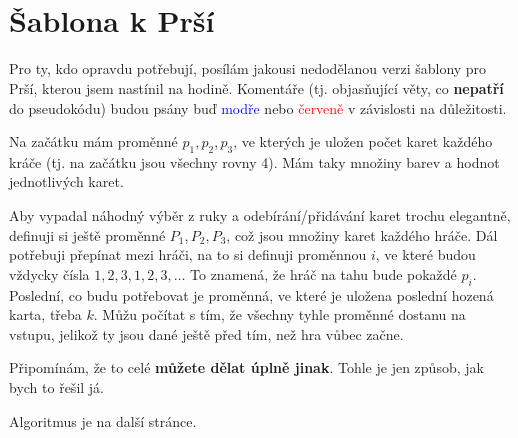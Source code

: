 \documentclass[a4paper,11pt]{article}
\title{\Huge\textsf{}\\
 \Large\textsf{}
 \author{}
 \date{}
}
\begin{document}
\section*{Šablona k Prší}

Pro ty, kdo opravdu potřebují, posílám jakousi nedodělanou verzi šablony pro
Prší, kterou jsem nastínil na hodině. Komentáře (tj. objasňující věty, co
\textbf{nepatří} do pseudokódu) budou psány buď \textcolor{blue}{modře} nebo
\textcolor{red}{červeně} v závislosti na důležitosti.

Na začátku mám proměnné $p_1, p_2, p_3$, ve kterých je uložen počet karet
každého kráče (tj. na začátku jsou všechny rovny 4). Mám taky množiny barev a
hodnot jednotlivých karet.

Aby vypadal náhodný výběr z ruky a odebírání/přidávání karet trochu elegantně,
definuji si ještě proměnné $P_1,P_2,P_3$, což jsou množiny karet každého hráče.
Dál potřebuji přepínat mezi hráči, na to si definuji proměnnou $i$, ve které
budou vždycky čísla $1, 2, 3, 1, 2, 3, \ldots$ To znamená, že hráč na tahu bude
pokaždé $p_i$. Poslední, co budu potřebovat je proměnná, ve které je uložena
poslední hozená karta, třeba $k$. Můžu počítat s tím, že všechny tyhle proměnné
dostanu na vstupu, jelikož ty jsou dané ještě před tím, než hra vůbec začne.

Připomínám, že to celé \textbf{můžete dělat úplně jinak}. Tohle je jen způsob,
jak bych to řešil já.

Algoritmus je na další stránce.
\end{document}
